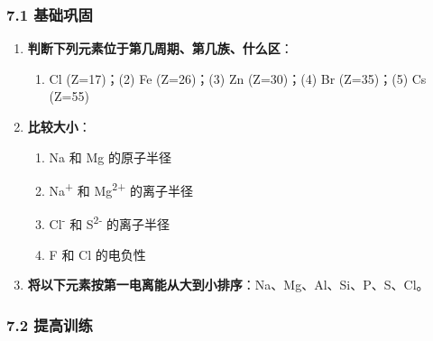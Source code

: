 \documentclass[a4paper,11pt]{ctexart}
\providecommand{\tightlist}{\setlength{\itemsep}{0pt}\setlength{\parskip}{0pt}}
\begin{document}
\subsubsection{7.1 基础巩固}\label{ux57faux7840ux5de9ux56fa}

\begin{enumerate}
\def\labelenumi{\arabic{enumi}.}
\tightlist
\item
  \textbf{判断下列元素位于第几周期、第几族、什么区}：

  \begin{enumerate}
  \def\labelenumii{(\arabic{enumii})}
  \tightlist
  \item
    Cl (Z=17)；(2) Fe (Z=26)；(3) Zn (Z=30)；(4) Br (Z=35)；(5) Cs (Z=55)
  \end{enumerate}
\item
  \textbf{比较大小}：

  \begin{enumerate}
  \def\labelenumii{(\arabic{enumii})}
  \tightlist
  \item
    Na 和 Mg 的原子半径
  \item
    Na\textsuperscript{+} 和 Mg\textsuperscript{2+} 的离子半径
  \item
    Cl\textsuperscript{-} 和 S\textsuperscript{2-} 的离子半径
  \item
    F 和 Cl 的电负性
  \end{enumerate}
\item
  \textbf{将以下元素按第一电离能从大到小排序}：Na、Mg、Al、Si、P、S、Cl。
\end{enumerate}

\subsubsection{7.2 提高训练}\label{ux63d0ux9ad8ux8badux7ec3}
\end{document}

